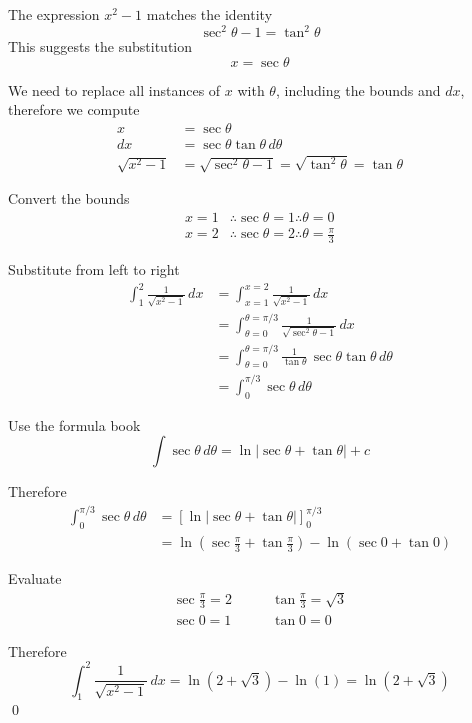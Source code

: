 \begin{solution}

    The expression $x^2-1$ matches the identity
    \[
        \sec^2\theta-1=\tan^2\theta
    \]
    This suggests the substitution
    \[
        x=\sec\theta
    \]

    We need to replace all instances of $x$ with $\theta$, including the bounds and $dx$, therefore we compute
    \begin{align*}
        x &= \sec\theta\\
        dx &= \sec\theta\tan\theta\,d\theta\\
        \sqrt{x^2-1} &= \sqrt{\sec^2\theta-1}=\sqrt{\tan^2\theta}=\tan\theta
    \end{align*}

    Convert the bounds
    \begin{align*}
        x=1 &\therefore \sec\theta=1 \therefore \theta=0\\
        x=2 &\therefore \sec\theta=2 \therefore \theta=\frac{\pi}{3}
    \end{align*}

    Substitute from left to right
    \begin{align*}
        \int_{1}^{2}\frac{1}{\sqrt{x^2-1}}\,dx
        &= \int_{x=1}^{x=2}\frac{1}{\sqrt{x^2-1}}\,dx\\
        &= \int_{\theta=0}^{\theta=\pi/3}\frac{1}{\sqrt{\sec^2\theta-1}}\,dx\\
        &= \int_{\theta=0}^{\theta=\pi/3}\frac{1}{\tan\theta}\,\sec\theta\tan\theta\,d\theta\\
        &= \int_{0}^{\pi/3}\sec\theta\,d\theta
    \end{align*}

    Use the formula book
    \[
        \int \sec\theta\,d\theta=\ln\left|\sec\theta+\tan\theta\right|+c
    \]

    Therefore
    \begin{align*}
        \int_{0}^{\pi/3}\sec\theta\,d\theta
        &= \left[\ln\left|\sec\theta+\tan\theta\right|\right]_{0}^{\pi/3}\\
        &= \ln\left(\sec\frac{\pi}{3}+\tan\frac{\pi}{3}\right)-\ln\left(\sec 0+\tan 0\right)
    \end{align*}

    Evaluate
    \begin{align*}
        \sec\frac{\pi}{3}=2 &\qquad \tan\frac{\pi}{3}=\sqrt{3}\\
        \sec 0=1 &\qquad \tan 0=0
    \end{align*}

    Therefore
    \[
        \int_{1}^{2}\frac{1}{\sqrt{x^2-1}}\,dx
        = \ln(2+\sqrt{3})-\ln(1)
        = \ln(2+\sqrt{3})
    \]
    \qed
\end{solution}


